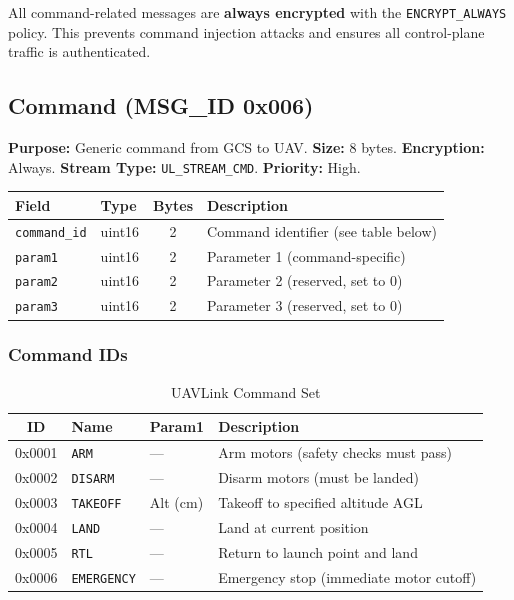 \documentclass[11pt,a4paper]{article}
\begin{document}
\begin{alertbox}
All command-related messages are \textbf{always encrypted} with the \texttt{ENCRYPT\_ALWAYS} policy. This prevents command injection attacks and ensures all control-plane traffic is authenticated.
\end{alertbox}

\subsection{Command (MSG\_ID 0x006)}

\textbf{Purpose:} Generic command from GCS to UAV. \textbf{Size:} 8 bytes. \textbf{Encryption:} Always. \textbf{Stream Type:} \texttt{UL\_STREAM\_CMD}. \textbf{Priority:} High.

\begin{table}[H]
\centering
\begin{tabular}{@{}llcl@{}}
\toprule
\textbf{Field} & \textbf{Type} & \textbf{Bytes} & \textbf{Description} \\
\midrule
\texttt{command\_id} & uint16 & 2 & Command identifier (see table below) \\
\texttt{param1}      & uint16 & 2 & Parameter 1 (command-specific) \\
\texttt{param2}      & uint16 & 2 & Parameter 2 (reserved, set to 0) \\
\texttt{param3}      & uint16 & 2 & Parameter 3 (reserved, set to 0) \\
\bottomrule
\end{tabular}
\end{table}

\subsubsection{Command IDs}

\begin{table}[H]
\centering
\caption{UAVLink Command Set}
\begin{tabular}{@{}clll@{}}
\toprule
\textbf{ID} & \textbf{Name} & \textbf{Param1} & \textbf{Description} \\
\midrule
0x0001 & \texttt{ARM}       & --- & Arm motors (safety checks must pass) \\
0x0002 & \texttt{DISARM}    & --- & Disarm motors (must be landed) \\
0x0003 & \texttt{TAKEOFF}   & Alt (cm) & Takeoff to specified altitude AGL \\
0x0004 & \texttt{LAND}      & --- & Land at current position \\
0x0005 & \texttt{RTL}       & --- & Return to launch point and land \\
0x0006 & \texttt{EMERGENCY} & --- & Emergency stop (immediate motor cutoff) \\
\bottomrule
\end{tabular}
\end{table}
\end{document}

